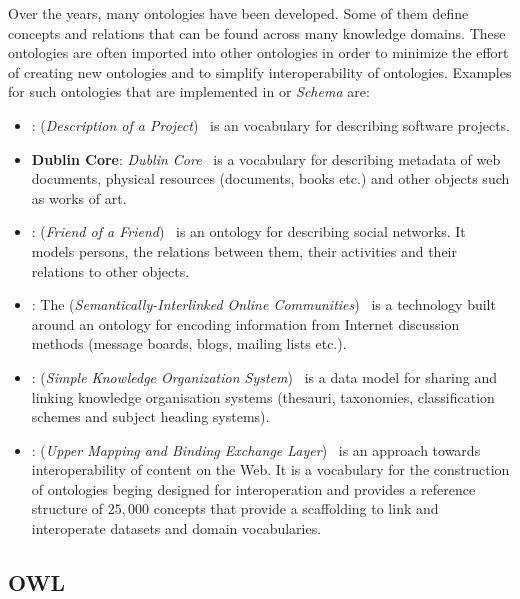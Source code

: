 Over the years, many ontologies have been developed. Some of them define concepts and relations that can be found across many knowledge domains. These ontologies are often imported into other ontologies in order to minimize the effort of creating new ontologies and to simplify interoperability of ontologies. Examples for such ontologies that are implemented in  or \emph{ Schema} are:
\begin{itemize}
  \item \textbf{}:  (\emph{Description of a Project})~\cite{DOAP} is an vocabulary for describing software projects.
  \item \textbf{Dublin Core}: \emph{Dublin Core}~\cite{DublinCoreWeb,rfc5013} is a vocabulary for describing metadata of web documents, physical resources (documents, books etc.) and other objects such as works of art.
  \item \textbf{}:  (\emph{Friend of a Friend})~\cite{FOAFWeb,FOAF} is an ontology for describing social networks. It models persons, the relations between them, their activities and their relations to other objects.
  \item \textbf{}: The  (\emph{Semantically-Interlinked Online Communities})~\cite{SIOC} is a technology built around an ontology for encoding information from Internet discussion methods (message boards, blogs, mailing lists etc.).
  \item \textbf{}:  (\emph{Simple Knowledge Organization System})~\cite{SKOSWeb,SKOS} is a data model for sharing and linking knowledge organisation systems (thesauri, taxonomies, classification schemes and subject heading systems).
  \item \textbf{}:  (\emph{Upper Mapping and Binding Exchange Layer})~\cite{UMBEL} is an approach towards interoperability of content on the Web. It is a vocabulary for the construction of ontologies beging designed for interoperation and provides a reference structure of $25,000$ concepts that provide a scaffolding to link and interoperate datasets and domain vocabularies.
\end{itemize}


\subsection{OWL}
\label{subsec:owl}

